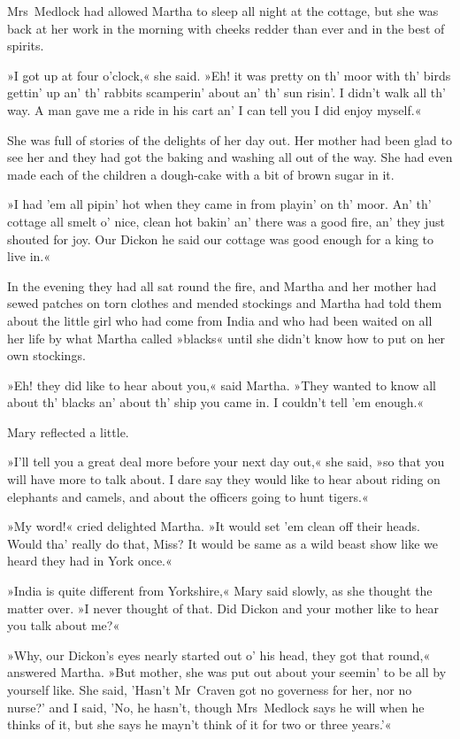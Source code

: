 Mrs~Medlock had allowed Martha to sleep all night at the cottage, but she was back at her work in the morning with cheeks redder than ever and in the best of spirits.

»I got up at four o'clock,« she said. »Eh! it was pretty on th' moor with th' birds gettin' up an' th' rabbits scamperin' about an' th' sun risin'. I didn't walk all th' way. A man gave me a ride in his cart an' I can tell you I did enjoy myself.«

She was full of stories of the delights of her day out. Her mother had been glad to see her and they had got the baking and washing all out of the way. She had even made each of the children a dough-cake with a bit of brown sugar in it.

»I had 'em all pipin' hot when they came in from playin' on th' moor. An' th' cottage all smelt o' nice, clean hot bakin' an' there was a good fire, an' they just shouted for joy. Our Dickon he said our cottage was good enough for a king to live in.«

In the evening they had all sat round the fire, and Martha and her mother had sewed patches on torn clothes and mended stockings and Martha had told them about the little girl who had come from India and who had been waited on all her life by what Martha called »blacks« until she didn't know how to put on her own stockings.

»Eh! they did like to hear about you,« said Martha. »They wanted to know all about th' blacks an' about th' ship you came in. I couldn't tell 'em enough.«

Mary reflected a little.

»I'll tell you a great deal more before your next day out,« she said, »so that you will have more to talk about. I dare say they would like to hear about riding on elephants and camels, and about the officers going to hunt tigers.«

»My word!« cried delighted Martha. »It would set 'em clean off their heads. Would tha' really do that, Miss? It would be same as a wild beast show like we heard they had in York once.«

»India is quite different from Yorkshire,« Mary said slowly, as she thought the matter over. »I never thought of that. Did Dickon and your mother like to hear you talk about me?«

»Why, our Dickon's eyes nearly started out o' his head, they got that round,« answered Martha. »But mother, she was put out about your seemin' to be all by yourself like. She said, 'Hasn't Mr~Craven got no governess for her, nor no nurse?' and I said, 'No, he hasn't, though Mrs~Medlock says he will when he thinks of it, but she says he mayn't think of it for two or three years.'«

